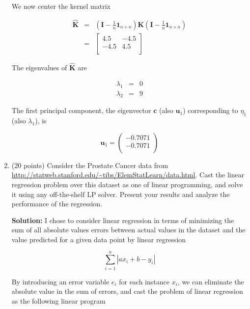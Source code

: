 \documentclass[11pt]{article}
\begin{document}
\begin{enumerate}
We now center the kernel matrix

\begin{eqnarray*}
\hat{\mathbf{K}} &=& \left( \mathbf{I} - \frac{1}{n} \mathbf{1}_{n \times n} \right) \mathbf{K} \left( \mathbf{I} - \frac{1}{n} \mathbf{1}_{n \times n} \right) \nonumber \\
&=& \left[
	\begin{array}{rr}
		4.5 & -4.5 \\
		-4.5 & 4.5 \\	
	\end{array}
\right]
\end{eqnarray*}

The eigenvalues of $\hat{\mathbf{K}}$ are

\begin{eqnarray}
\lambda_1 &=& 0 \\
\lambda_2 &=& 9
\end{eqnarray}

The first principal component, the eigenvector $\mathbf{c}$ (also $\mathbf{u}_1$) corresponding to $\eta_1$ (also $\lambda_1$), is

\begin{equation}
\mathbf{u}_1 = \left(
	\begin{array}{r}
		-0.7071 \\
		-0.7071 \\
	\end{array}
\right)
\end{equation}

\item (20 points) Consider the Prostate Cancer data from \url{http://statweb.stanford.edu/~tibs/ElemStatLearn/data.html}. Cast the linear regression problem over this dataset as one of linear programming, and solve it using any off-the-shelf LP solver. Present your results and analyze the performance of the regression.

\textbf{Solution:} I chose to consider linear regression in terms of minimizing the sum of all absolute values errors between actual values in the dataset and the value predicted for a given data point by linear regression

\begin{equation*}
\sum\limits_{i=1}^n | ax_i + b - y_i|
\end{equation*}

By introducing an error variable $e_i$ for each instance $x_i$, we can eliminate the absolute value in the sum of errors, and cast the problem of linear regression as the following linear program


\end{enumerate}
\end{document}
